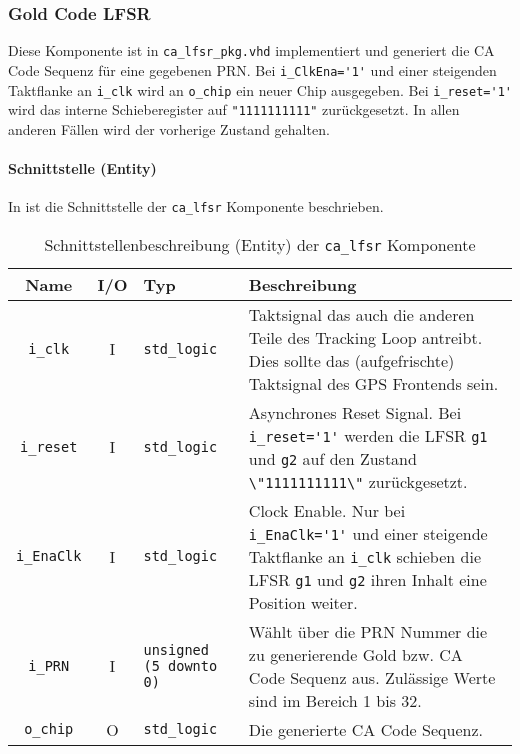 \subsubsection{Gold Code LFSR}
Diese Komponente ist in  \lstinline$ca_lfsr_pkg.vhd$ implementiert und generiert die \gls{CA} Code Sequenz für eine gegebenen PRN. Bei \lstinline$i_ClkEna='1'$ und einer steigenden Taktflanke an \lstinline$i_clk$ wird an \lstinline$o_chip$ ein neuer Chip ausgegeben. Bei \lstinline$i_reset='1'$ wird das interne Schieberegister auf \lstinline$"1111111111"$ zurückgesetzt. In allen anderen Fällen wird der vorherige Zustand gehalten.


\paragraph{Schnittstelle (Entity)}
In  ist die Schnittstelle der \lstinline$ca_lfsr$ Komponente beschrieben.

\begin{table}[htbp]
    \ttabbox
    {
        \caption[LFSR Schnittstelle]{Schnittstellenbeschreibung (Entity) der \lstinline$ca_lfsr$ Komponente}
        \label{TabCALFSR_Entity}
    }
    {
    \begin{tabular}{c c  p{2cm} p{6cm}}
        \toprule
        Name                    & I/O  & Typ                               & Beschreibung \\
        \midrule
        \lstinline$i_clk$       & I         & \lstinline$std_logic$             & Taktsignal das auch die anderen Teile des Tracking Loop antreibt. Dies sollte das (aufgefrischte) Taktsignal des GPS Frontends sein.\\
        \lstinline$i_reset$     & I         & \lstinline$std_logic$             & Asynchrones Reset Signal. Bei \lstinline$i_reset='1'$ werden die LFSR \lstinline$g1$ und \lstinline$g2$ auf den Zustand \lstinline$\"1111111111\"$ zurückgesetzt.\\
        \lstinline$i_EnaClk$    & I         & \lstinline$std_logic$             & Clock Enable. Nur bei \lstinline$i_EnaClk='1'$ und einer steigende Taktflanke an \lstinline$i_clk$ schieben die LFSR \lstinline$g1$ und \lstinline$g2$ ihren Inhalt eine Position weiter.\\
        \lstinline$i_PRN$       & I         & \lstinline$unsigned (5 downto 0)$ & Wählt über die PRN Nummer die zu generierende Gold bzw. \gls{CA} Code Sequenz aus. Zulässige Werte sind im Bereich 1 bis 32.\\
        \lstinline$o_chip$      & O         & \lstinline$std_logic$             & Die generierte \gls{CA} Code Sequenz.\\
        \bottomrule
    \end{tabular}
}
\end{table}

